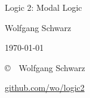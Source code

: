 \begingroup
\thispagestyle{empty}

\begin{center}


  

  {\huge Logic 2: Modal Logic\par}

  \vspace{5mm}
  
  

  \vspace{10mm}

  {\normalsize Wolfgang Schwarz}

  \vspace{2mm}
  {\normalsize \today}

\end{center}

\vfill
\endgroup
{

  \footnotesize

 \noindent \copyright\ \the\year\ Wolfgang Schwarz

 \smallskip
 \noindent \href{https://github.com/wo/logic2}{github.com/wo/logic2}

 \vspace{-1.5mm}
 \doclicenseThis

}

  

{
\newpage
\small
\tableofcontents 
}

\normalsize



